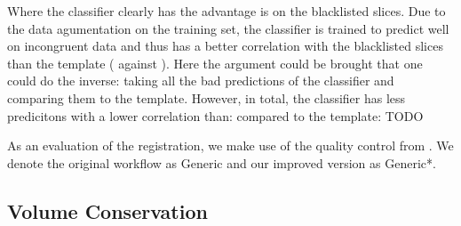Where the classifier clearly has the advantage is on the blacklisted slices.
Due to the data agumentation on the training set, the classifier is trained to predict well on incongruent data and thus has a better correlation with the blacklisted slices than the template ( against ).
Here the argument could be brought that one could do the inverse: taking all the bad predictions of the classifier and comparing them to the template.
However, in total, the classifier has less predicitons with a lower correlation than: compared to the template: TODO
\fi



As an evaluation of the registration, we make use of the quality control from \cite{ioanas_optimized_2019}.
We denote the original workflow as Generic and our improved version as Generic*.

\subsection{Volume Conservation}

